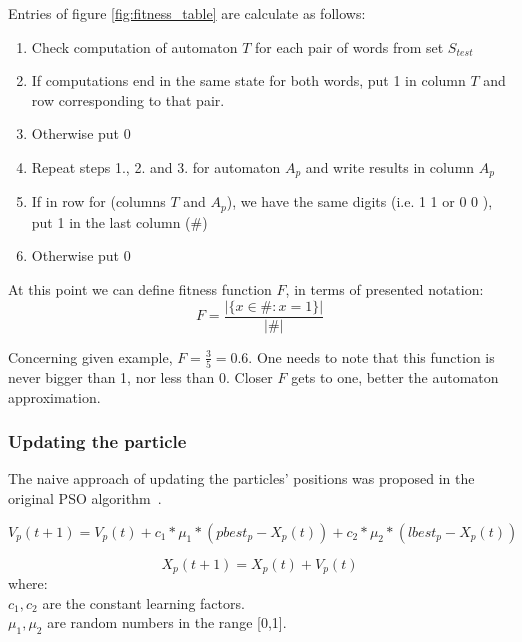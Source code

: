\documentclass[runningheads, a4paper]{llncs}
\begin{document}
Entries of figure \ref{fig:fitness_table} are calculate as follows:
\begin{enumerate}
\item Check computation of automaton $T$ for each pair of words from set $S_{test}$
\item If computations end in the same state for both words, put 1 in column $T$ and row corresponding to that pair.
\item Otherwise put 0
\item Repeat steps 1., 2. and 3. for automaton $A_p$ and write results in column $A_p$
\item If in row for (columns $T$ and $A_p$), we have the same digits (i.e. 1 1 or 0 0 ), put 1 in the last column ($\#$)
\item Otherwise put 0
\end{enumerate}

At this point we can define fitness function $F$, in terms of presented notation:
\[
	F = \frac{|\{x \in \# : x = 1 \}|}{|\#|}
\]



Concerning given example, $F = \frac{3}{5} = 0.6$. One needs to note that this function is never bigger than 1, nor less than 0. Closer $F$ gets to one, better the automaton approximation. 
\subsubsection{Updating the particle}



The naive approach of updating the particles' positions was proposed in the original PSO algorithm~\cite{pso_origin}.

\begin{equation}
	V_p(t+1) = V_p(t) + c_1 * \mu_1 *(pbest_p - X_p(t)) + c_2 * \mu_2 *(lbest_p - X_p(t))
\end{equation}

\begin{equation}
		X_p(t+1) = X_p(t) + V_p(t)
\end{equation}
where:\\
$c_1, c_2$ are the constant learning factors.\\
$\mu_1, \mu_2$ are random numbers in the range [0,1].\\
\end{document}
